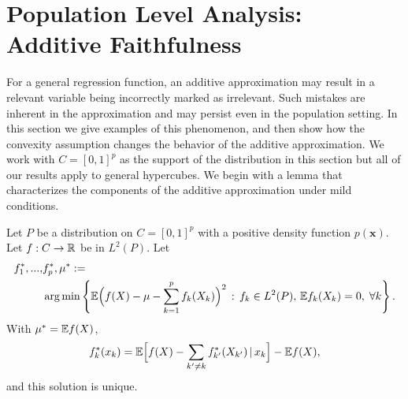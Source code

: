 
\section{Population Level Analysis: Additive Faithfulness}
\label{sec:additivefaithful}

For a general regression function, an additive approximation may result in a
relevant variable being incorrectly marked as irrelevant. Such
mistakes are inherent in the approximation and may persist even in
the population setting.  In this section we give
examples of this phenomenon, and then show how the convexity
assumption
changes the behavior of the additive approximation. We work with $C=[0,1]^p$ as the support of the distribution in this section but all of our results apply to general hypercubes. We begin
with a lemma that characterizes the components of the additive approximation under mild conditions. 



\begin{lemma}
\label{lem:general_int_reduction}
Let $P$ be a distribution on $C=[0,1]^p$ with a positive density
function $p(\mathbf{x})$. Let $f: C \rightarrow {\mathbb R}$ be in $L^2(P)$. Let
\begin{align*}
f^*_1,...,&f^*_p, \mu^* :=  \\
&\arg\min \left\{ {\mathbb E} \Bigl( f(X) - \mu - \sum_{k=1}^p f_k(X_k)\Bigr)^2 \,:\,
f_k \in L^2(P),\, {\mathbb E} f_k(X_k) = 0,\; \forall k\right\}.
\end{align*}
With $\mu^* = {\mathbb E} f(X)$, 
\begin{equation}
\label{eq:backfit}
f^*_k(x_k) = {\mathbb E}\Bigl[ f(X) - \sum_{k' \neq k} f^*_{k'}(X_{k'}) {\,|\,}
x_k\Bigr] - {\mathbb E} f(X), 
\end{equation}
and this solution is unique. 
\end{lemma}


